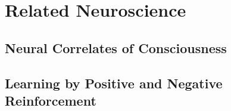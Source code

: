 \chapter{Related Neuroscience}

\section{Neural Correlates of Consciousness}

\section{Learning by Positive and Negative Reinforcement}


